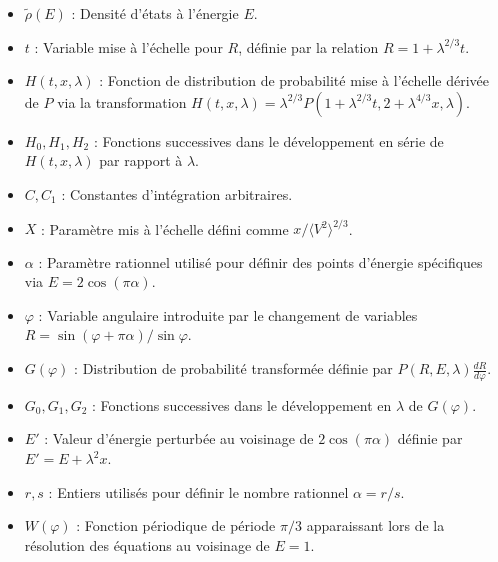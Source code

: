 \begin{itemize}
    \item $\tilde{\rho}(E)$ : Densité d'états à l'énergie $E$.
    \item $t$ : Variable mise à l'échelle pour $R$, définie par la relation $R = 1 + \lambda^{2/3}t$.
    \item $H(t, x, \lambda)$ : Fonction de distribution de probabilité mise à l'échelle dérivée de $P$ via la transformation $H(t, x, \lambda) = \lambda^{2/3}P(1+\lambda^{2/3}t, 2+\lambda^{4/3}x, \lambda)$.
    \item $H_0, H_1, H_2$ : Fonctions successives dans le développement en série de $H(t, x, \lambda)$ par rapport à $\lambda$.
    \item $C, C_1$ : Constantes d'intégration arbitraires.
    \item $X$ : Paramètre mis à l'échelle défini comme $x / \langle V^2 \rangle^{2/3}$.
    \item $\alpha$ : Paramètre rationnel utilisé pour définir des points d'énergie spécifiques via $E = 2 \cos(\pi\alpha)$.
    \item $\varphi$ : Variable angulaire introduite par le changement de variables $R = \sin(\varphi+\pi\alpha)/\sin\varphi$.
    \item $G(\varphi)$ : Distribution de probabilité transformée définie par $P(R, E, \lambda) \frac{dR}{d\varphi}$.
    \item $G_0, G_1, G_2$ : Fonctions successives dans le développement en $\lambda$ de $G(\varphi)$.
    \item $E'$ : Valeur d'énergie perturbée au voisinage de $2 \cos(\pi\alpha)$ définie par $E' = E + \lambda^2 x$.
    \item $r, s$ : Entiers utilisés pour définir le nombre rationnel $\alpha = r/s$.
    \item $W(\varphi)$ : Fonction périodique de période $\pi/3$ apparaissant lors de la résolution des équations au voisinage de $E=1$.
\end{itemize}

